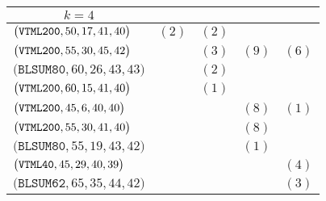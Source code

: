 \begin{table}
\begin{tabular}{lcccc}
\multicolumn{1}{c}{$k = 4$} & \multicolumn{4}{l}{} \\
\hline
$\bigl(\texttt{VTML}\texttt{200}, 50, 17, 41, 40\bigr)$	  	&	$(2)$	&	$(2)$	&		&		\\
$\bigl(\texttt{VTML}\texttt{200}, 55, 30, 45, 42\bigr)$	 	&		&	$(3)$	&	$(9)$ 	&	$(6)$	\\
$\bigl(\texttt{BLSUM}\texttt{80}, 60, 26, 43, 43\bigr)$ 	&		&	$(2)$	&		&		\\
$\bigl(\texttt{VTML}\texttt{200}, 60, 15, 41, 40\bigr)$	 	&		&	$(1)$	&		&		\\
$\bigl(\texttt{VTML}\texttt{200}, 45, 6, 40, 40\bigr)$	 	&		& 		&	$(8)$	 &	$(1)$	\\
$\bigl(\texttt{VTML}\texttt{200}, 55, 30, 41, 40\bigr)$	 	&		&		&	$(8)$	&		\\
$\bigl(\texttt{BLSUM}\texttt{80}, 55, 19, 43, 42\bigr)$ 	&		&		&	$(1)$	&		\\
$\bigl(\texttt{VTML}\texttt{40}, 45, 29, 40, 39\bigr)$		&		&		&		&	$(4)$	\\
$\bigl(\texttt{BLSUM}\texttt{62}, 65, 35, 44, 42\bigr)$ 	&		&		&		&	$(3)$	\\
\hline
\hline
\end{tabular}
\end{table}
